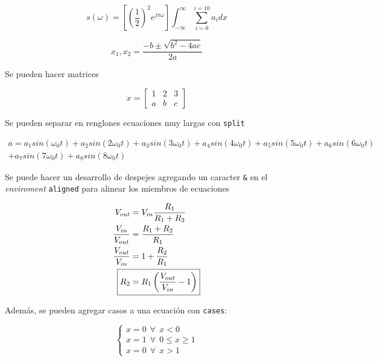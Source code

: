 \begin{equation}
    s(\omega) = \left[ \left(\frac{1}{2}\right)^2 e^{j \pi \omega} \right] \int_{-\infty}^{\infty} \sum_{i=0}^{i=10} a_i dx
    \label{eq:algun_nombre}
\end{equation}

\begin{equation*}
    x_1,x_2 = \frac{-b \pm \sqrt{b^2 -4ac} }{2a}
\end{equation*}

Se pueden hacer matrices

\begin{equation}
    x = \begin{bmatrix}
        1 & 2 & 3\\
        a & b & c
        \end{bmatrix}
\end{equation}

Se pueden separar en renglones ecuaciones muy largas con \texttt{split}

\begin{equation}
    \begin{split}
        a = a_1 sin(\omega_0 t) + a_2 sin(2\omega_0 t) + a_3 sin(3\omega_0 t) + a_4 sin(4\omega_0 t) + a_5 sin(5\omega_0 t) + a_6 sin(6\omega_0 t) \\ + a_7 sin(7\omega_0 t) + a_8 sin(8\omega_0 t)
    \end{split}
\end{equation}

Se puede hacer un desarrollo de despejes agregando un caracter \texttt{\&} en el \textit{enviroment} \texttt{aligned} para alinear los miembros de ecuaciones

\begin{equation}
    \begin{split}
        V_{out} &= V_{in} \frac{R_1}{R_1+R_2} \\
        \frac{V_{in}}{V_{out}} &= \frac{R_1+R_2}{R_1} \\
        \frac{V_{out}}{V_{in}} &= 1+\frac{R_2}{R_1} \\
        \Aboxed{R_2 &= R_1 \left( \frac{V_{out}}{V_{in}} - 1 \right)}
    \end{split}
\end{equation}

Además, se pueden agregar casos a una ecuación con \texttt{cases}:

\begin{equation}
    \begin{cases}
    x = 0 ~~ \forall ~~ x < 0\\
    x = 1 ~~ \forall ~~ 0 \leq x \geq 1 \\
    x = 0 ~~ \forall ~~ x > 1 
    \end{cases}
\end{equation}


